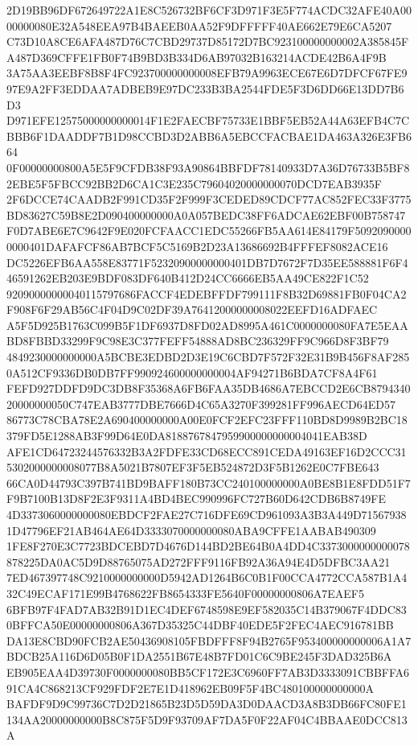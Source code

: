 \documentclass[UTF8,fontset=fandol,zihao=-4,a4paper]{ctexart}
\begin{document}
{{2D19BB96DF672649722A1E8C526732BF6CF3D971F3E5F774ACDC32AFE40A0000000080E32A548EEA97B4BAEEB0AA52F9DFFFFF40AE662E79E6CA5207
C73D10A8CE6AFA487D76C7CBD29737D85172D7BC923100000000002A385845FA487D369CFFE1FB0F74B9BD3B334D6AB97032B163214ACDE42B6A4F9B
3A75AA3EEBF8B8F4FC923700000000008EFB79A9963ECE67E6D7DFCF67FE997E9A2FF3EDDAA7ADBEB9E97DC233B3BA2544FDE5F3D6DD66E13DD7B6D3
D971EFE12575000000000014F1E2FAECBF75733E1BBF5EB52A44A63EFB4C7CBBB6F1DAADDF7B1D98CCBD3D2ABB6A5EBCCFACBAE1DA463A326E3FB664
0F00000000800A5E5F9CFDB38F93A90864BBFDF78140933D7A36D76733B5BF82EBE5F5FBCC92BB2D6CA1C3E235C79604020000000070DCD7EAB3935F
2F6DCCE74CAADB2F991CD35F2F999F3CEDED89CDCF77AC852FEC33F3775BD83627C59B8E2D090400000000A0A057BEDC38FF6ADCAE62EBF00B758747
F0D7ABE6E7C9642F9E020FCFAACC1EDC55266FB5AA614E84179F50920900000000401DAFAFCF86AB7BCF5C5169B2D23A13686692B4FFFEF8082ACE16
DC5226EFB6AA558E83771F52320900000000401DB7D7672F7D35EE588881F6F446591262EB203E9BDF083DF640B412D24CC6666EB5AA49CE822F1C52
92090000000040115797686FACCF4EDEBFFDF799111F8B32D69881FB0F04CA2F908F6F29AB56C4F04D9C02DF39A76412000000008022EEFD16ADFAEC
A5F5D925B1763C099B5F1DF6937D8FD02AD8995A461C0000000080FA7E5EAABD8FBBD33299F9C98E3C377FEFF54888AD8BC236329FF9C966D8F3BF79
4849230000000000A5BCBE3EDBD2D3E19C6CBD7F572F32E31B9B456F8AF2850A512CF9336DB0DB7FF990924600000000004AF94271B6BDA7CF8A4F61
FEFD927DDFD9DC3DB8F35368A6FB6FAA35DB4686A7EBCCD2E6CB879434020000000050C747EAB3777DBE7666D4C65A3270F399281FF996AECD64ED57
86773C78CBA78E2A690400000000A00E0FCF2EFC23FFF110BD8D9989B2BC18379FD5E1288AB3F99D64E0DA8188767847959900000000004041EAB38D
AFE1CD64723244576332B3A2FDFE33CD68ECC891CEDA49163EF16D2CCC315302000000008077B8A5021B7807EF3F5EB524872D3F5B1262E0C7FBE643
66CA0D44793C397B741BD9BAFF180B73CC240100000000A0BE8B1E8FDD51F7F9B7100B13D8F2E3F9311A4BD4BEC990996FC727B60D642CDB6B8749FE
4D3373060000000080EBDCF2FAE27C716DFE69CD961093A3B3A449D715679381D47796EF21AB464AE64D3333070000000080ABA9CFFE1AABAB490309
1FE8F270E3C7723BDCEBD7D4676D144BD2BE64B0A4DD4C3373000000000078878225DA0AC5D9D88765075AD272FFF9116FB92A36A94E4D5DFBC3AA21
7ED467397748C9210000000000D5942AD1264B6C0B1F00CCA4772CCA587B1A432C49ECAF171E99B4768622FB8654333FE5640F00000000806A7EAEF5
6BFB97F4FAD7AB32B91D1EC4DEF6748598E9EF582035C14B379067F4DDC830BFFCA50E00000000806A367D35325C44DBF40EDE5F2FEC4AEC916781BB
DA13E8CBD90FCB2AE50436908105FBDFFF8F94B2765F953400000000006A1A7BDCB25A116D6D05B0F1DA2551B67E48B7FD01C6C9BE245F3DAD325B6A
EB905EAA4D39730F0000000080BB5CF172E3C6960FF7AB3D3333091CBBFFA691CA4C868213CF929FDF2E7E1D418962EB09F5F4BC480100000000000A
BAFDF9D9C99736C7D2D21865B23D5D59DA3D0DAACD3A8B3DB66FC80FE1134AA20000000000B8C875F5D9F93709AF7DA5F0F22AF04C4BBAAE0DCC813A
}}
\end{document}

